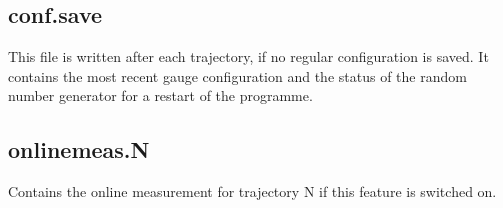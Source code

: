 \subsection*{\ttfamily conf.save}
This file is written after each trajectory, if no regular
configuration is saved. It contains the most recent gauge
configuration and the status of the random number generator for a
restart of the programme. 

\subsection*{\ttfamily onlinemeas.N}
Contains the online measurement for trajectory {\ttfamily N} if this
feature is switched on.


